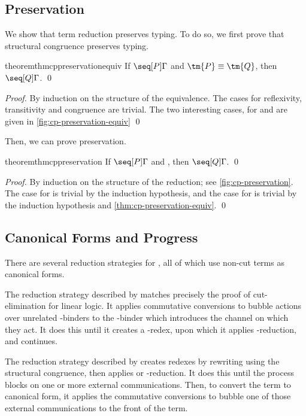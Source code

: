 \documentclass[UKenglish]{llncs}
\begin{document}
\subsection{Preservation}
\label{sec:cp-preservation}
We show that term reduction preserves typing. To do so, we first prove that
structural congruence preserves typing.
\begin{restatable}{theorem}{thmcppreservationequiv}\label{thm:cp-preservation-equiv}
  If $\seq[{ P }]{ \Gamma }$ and $\tm{P} \equiv \tm{Q}$,
  then $\seq[{ Q }]{\Gamma }$.
  \qed
\end{restatable}
\begin{proof}
  By induction on the structure of the equivalence. The cases for reflexivity,
  transitivity and congruence are trivial. The two interesting cases, for
  \cpEquivCutComm and  are given in \cref{fig:cp-preservation-equiv}
  \qed
\end{proof}

Then, we can prove preservation.
\begin{restatable}[Preservation]{theorem}{thmcppreservation}\label{thm:cp-preservation}
  If $\seq[{ P }]{ \Gamma }$ and ,
  then $\seq[{ Q }]{ \Gamma }$.
  \qed
\end{restatable}
\begin{proof}
  By induction on the structure of the reduction; see \cref{fig:cp-preservation}.
  The case for \cpRedGammaCut is trivial by the induction hypothesis, and the
  case for \cpRedGammaEquiv is trivial by the induction hypothesis and
  \cref{thm:cp-preservation-equiv}.
  \qed
\end{proof}


\subsection{Canonical Forms and Progress}
\label{sec:cp-progress}
There are several reduction strategies for \cp, all of which use non-cut terms
as canonical forms.

The reduction strategy described by \textcite{wadler2012} matches precisely the
proof of cut-elimination for linear logic. It applies commutative conversions to
bubble actions over unrelated \textnu-binders to the \textnu-binder which
introduces the channel on which they act. It does this until it creates a
\textbeta-redex, upon which it applies \textbeta-reduction, and continues.

The reduction strategy described by \citeauthor{lindley2015semantics} creates
redexes by rewriting using the structural congruence, then applies
 or \textbeta-reduction. It does this until the process blocks on
one or more external communications. Then, to convert the term to canonical
form, it applies the commutative conversions to bubble one of those external
communications to the front of the term.
\end{document}
